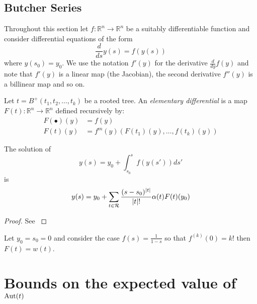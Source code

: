  \subsection{Butcher Series}
 Throughout this section let $f: \mathbb{R}^n \rightarrow \mathbb{R}^n$ be a suitably differentiable function and consider differential equations of the form 
 \[
  \frac{d}{ds}{y(s)} = f(y(s))
 \]
where $y(s_0) = y_0$.  We use the notation $f'(y)$ for the derivative $\frac{d}{dy}f(y)$ and note that $f'(y)$ is a linear map (the Jacobian), the second derivative $f''(y)$ is a billinear map and so on. 

\begin{defn}
Let $t = B^{+}(t_1,t_2,\dots,t_k)$ be  a rooted tree. An \emph{elementary differential} is a map  $F(t):  \mathbb{R}^n \rightarrow \mathbb{R}^n$ defined 
recursively by:
\begin{align}
 F(\bullet)(y) &= f(y) \\%
 F(t)(y) &= f^{m}(y)(F(t_1)(y),\dots,f(t_k)(y))
 \end{align}
\end{defn}
\begin{theorem}\label{Butcher}
 The solution of 
 \[
  y(s) = y_0 + \int_{s_0}^{s} f(y(s')) ds'
 \]
is
\[
 y(s) = y_0 + \sum_{t \in \operatorname{\mathcal{R}}} \frac{(s-s_0)^{\lvert t \rvert}}{\lvert t \rvert !}\alpha(t)F(t)(y_0)
\]
\end{theorem}

\begin{proof}
 See \cite{Butcher,Brouder}
\end{proof}

\begin{ex}\label{ex:1}
 Let $y_0 = s_0 = 0$  and consider the case $f(s) = \frac{1}{1-s}$ so that  $f^{(k)}(0) = k!$ then $F(t) = w(t)$.
\end{ex}


\section{Bounds on the expected value of $\operatorname{Aut}(t)$}
